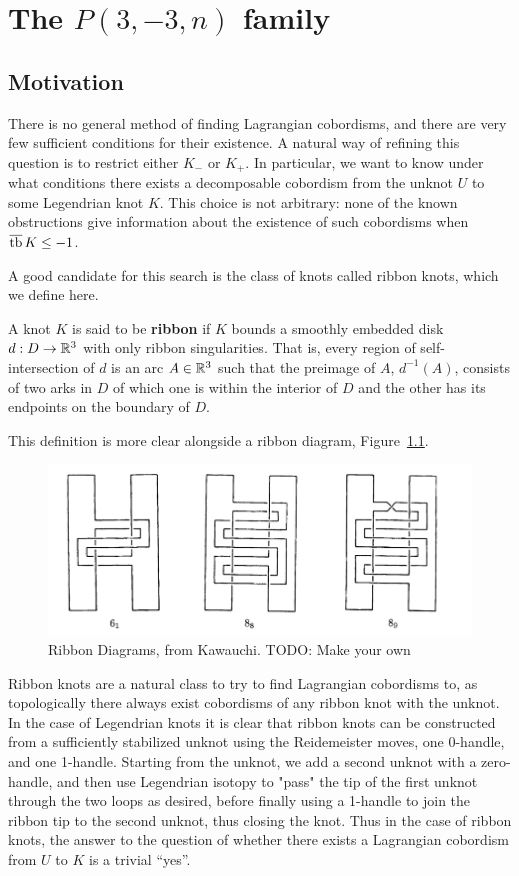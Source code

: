 \chapter{The \texorpdfstring{$P(3, -3, n)$}{P(3, -3, n)} family}
\section{Motivation}
There is no general method of finding Lagrangian cobordisms, and there are very few sufficient conditions for their existence.
A natural way of refining this question is to restrict either $K_-$ or $K_+$.
In particular, we want to know under what conditions there exists a decomposable cobordism from the unknot $U$ to some Legendrian knot $K$. This choice is not arbitrary: none of the known obstructions give information about the existence of such cobordisms when $\overline{\operatorname{tb}}\, K \leq -1$.

A good candidate for this search is the class of knots called ribbon knots, which we define here.

\begin{definition}
    A knot $K$ is said to be \textbf{ribbon} if $K$ bounds a smoothly embedded disk $d: D \to \mathbb{R}^3$ with only ribbon singularities.
    That is, every region of self-intersection of $d$ is an arc $A \in \mathbb{R}^3$ such that the preimage of $A$, $d^{-1} (A)$, consists of two arks in $D$ of which one is within the interior of $D$ and the other has its endpoints on the boundary of $D$.
\end{definition}

This definition is more clear alongside a ribbon diagram, Figure~\ref{fig:ribbon-knots-kawauchi}.

\begin{figure}[ht!]
    \centering
    \includegraphics[width=0.8\linewidth]{images/ribbon-knots-kawauchi.png}
    \caption{Ribbon Diagrams, from Kawauchi. TODO: Make your own}%
    \label{fig:ribbon-knots-kawauchi}
\end{figure}

Ribbon knots are a natural class to try to find Lagrangian cobordisms to, as topologically there always exist cobordisms of any ribbon knot with the unknot.
In the case of Legendrian knots it is clear that ribbon knots can be constructed from a sufficiently stabilized unknot using the Reidemeister moves, one 0-handle, and one 1-handle. 
Starting from the unknot, we add a second unknot with a zero-handle, and then use Legendrian isotopy to "pass" the tip of the first unknot through the two loops as desired, before finally using a 1-handle to join the ribbon tip to the second unknot, thus closing the knot. Thus in the case of ribbon knots, the answer to the question of whether there exists a Lagrangian cobordism from $U$ to $K$ is a trivial ``yes''.

